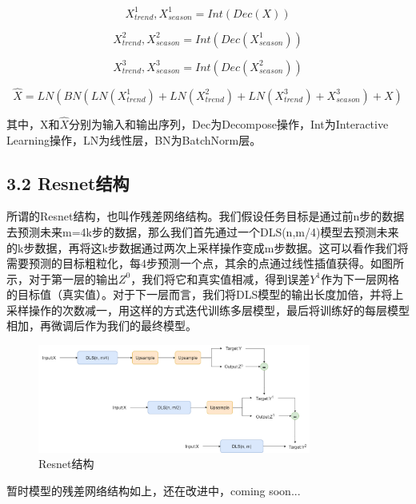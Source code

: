 \documentclass[twoside,a4paper]{article}
\begin{document}
\begin{equation}
    X_{trend}^1, X_{season}^1 = Int(Dec(X))
\end{equation}

\begin{equation}
    X_{trend}^2, X_{season}^2 = Int(Dec(X_{season}^1))
\end{equation}

\begin{equation}
    X_{trend}^3, X_{season}^3 = Int(Dec(X_{season}^2))
\end{equation}

\begin{equation}
    \hat{X} = LN(BN(LN(X_{trend}^1)+LN(X_{trend}^2)+LN(X_{trend}^3)+X_{season}^3) + X)
\end{equation}

\noindent 其中，X和$\hat{X}$分别为输入和输出序列，Dec为Decompose操作，Int为Interactive Learning操作，LN为线性层，BN为BatchNorm层。\par

\subsection*{3.2 Resnet结构}

所谓的Resnet结构，也叫作残差网络结构。我们假设任务目标是通过前n步的数据去预测未来m=4k步的数据，那么我们首先通过一个DLS(n,m/4)模型去预测未来的k步数据，再将这k步数据通过两次上采样操作变成m步数据。这可以看作我们将需要预测的目标粗粒化，每4步预测一个点，其余的点通过线性插值获得。如图所示，对于第一层的输出$Z^0$，我们将它和真实值相减，得到误差$Y^1$作为下一层网格的目标值（真实值）。对于下一层而言，我们将DLS模型的输出长度加倍，并将上采样操作的次数减一，用这样的方式迭代训练多层模型，最后将训练好的每层模型相加，再微调后作为我们的最终模型。

\begin{figure}[H]
\centering 
\includegraphics[width=0.8\textwidth]{DLS_Resnet.png} 
\caption{Resnet结构}
\end{figure}

暂时模型的残差网络结构如上，还在改进中，coming soon...
\end{document}
